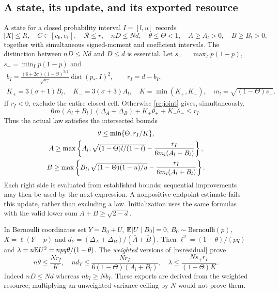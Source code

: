 \subsection{A state, its update, and its exported resource}
A state for a closed probability interval $I=[l,u]$ records
\[
 |X|\le R,\quad C\in[c_0,c_1],\quad\mathcal R\le r,
 \quad nD\le Nd,\quad\theta\le\Theta<1,
 \quad A\ge A_l>0,\quad B\ge B_l>0,
\]
together with simultaneous signed-moment and coefficient intervals.
The distinction between $nD\le Nd$ and $D\le d$ is essential.
Let $s_+=\max_Ip(1-p)$, $s_-=\min_Ip(1-p)$ and
\begin{gather*}
 b_I=\frac{(6+2\sigma)(1-\Theta)^{3/2}}{\sqrt{s_+}}
                 \operatorname{dist}(p_*,I)^2,
 \qquad r_I=d-b_I,\\
 K_+=3(\sigma+1)B_l,\quad K_-=3(\sigma+3)A_l,
 \quad K=\min(K_+,K_-),\quad m_l=\sqrt{(1-\Theta)s_-}.
\end{gather*}
If $r_I<0$, exclude the entire closed cell. Otherwise \eqref{re:joint}
gives, simultaneously,
\begin{equation}\label{re:residual}
 6m(A_l+B_l)(\Delta_A+\Delta_B)+K_+\theta_++K_-\theta_-\le r_I.
\end{equation}
Thus the actual law satisfies the intersected bounds
\begin{gather}
 \theta\le\min\{\Theta,r_I/K\},\notag\\
 A\ge\max\left\{A_l,\sqrt{(1-\Theta)l/(1-l)}-
                  \frac{r_I}{6m_l(A_l+B_l)}\right\},\notag\\
 B\ge\max\left\{B_l,\sqrt{(1-\Theta)(1-u)/u}-
                  \frac{r_I}{6m_l(A_l+B_l)}\right\}.\label{re:geometry}
\end{gather}
Each right side is evaluated from established bounds; sequential
improvements may then be used by the next expression. A nonpositive
endpoint estimate fails this update, rather than excluding a law.
Initialization uses the same formulas with the valid lower sum
$A+B\ge\sqrt{2-d}$.

In Bernoulli coordinates set $Y=B_0+U$, $\mathbb E[U\mid B_0]=0$,
$B_0\sim\mathrm{Bernoulli}(p)$, $X=\ell(Y-p)$ and
$d_Y=(\Delta_A+\Delta_B)/(\bar A+\bar B)$.
Then $\ell^2=(1-\theta)/(pq)$ and $\lambda=n\mathbb E U^2=npq\theta/(1-\theta)$.
The \emph{weighted} versions of \eqref{re:residual} prove
\begin{equation}\label{re:exports}
 n\theta\le\frac{Nr_I}{K},\quad
 nd_Y\le\frac{Nr_I}{6(1-\Theta)(A_l+B_l)},\quad
 \lambda\le\frac{Ns_+r_I}{(1-\Theta)K}.
\end{equation}
Indeed $nD\le Nd$ whereas $nb_I\ge Nb_I$.
These exports are derived from the weighted resource; multiplying an
unweighted variance ceiling by $N$ would not prove them.

